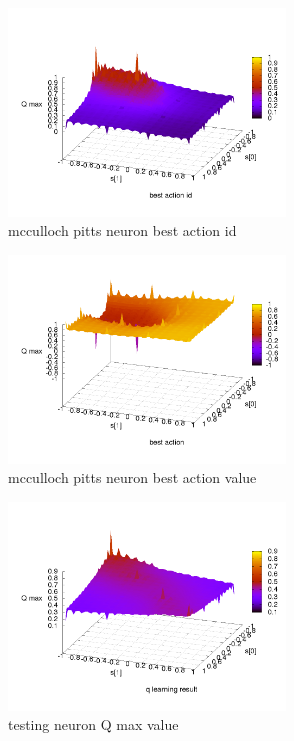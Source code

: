 \documentclass[10pt,a5paper]{article}
\begin{document}
\begin{figure}[!ht]
\centering
\includegraphics[width=2.9in]{q_learning_test/experiment_02/mcculloch_pitts_neuron/q_action_id.png}
\caption{mcculloch pitts neuron best action id}
\label{mcculloch pitts neuron best action id}
\end{figure}

\begin{figure}[!ht]
\centering
\includegraphics[width=2.9in]{q_learning_test/experiment_02/mcculloch_pitts_neuron/q_action.png}
\caption{mcculloch pitts neuron best action value}
\label{mcculloch pitts neuron best action value}
\end{figure}

\begin{figure}[!ht]
\centering
\includegraphics[width=2.9in]{q_learning_test/experiment_02/testing_neuron/q_map.png}
\caption{testing neuron Q max value}
\label{testing neuron Q max value}
\end{figure}
\end{document}
